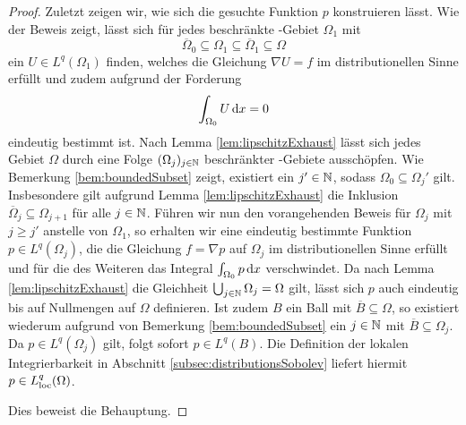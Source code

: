 \begin{proof}
  Zuletzt zeigen wir, wie sich die gesuchte Funktion $p$ konstruieren lässt.
  Wie der Beweis zeigt, lässt sich für jedes beschränkte \lipschitz\hyp{}Gebiet $\Omega_1$ mit $$\overline\Omega_0 \subseteq \Omega_1 \subseteq \overline\Omega_1 \subseteq \Omega$$ ein $U \in L^q(\Omega_1)$ finden, welches die Gleichung $\nabla U = f$ im distributionellen Sinne erfüllt und zudem aufgrund der Forderung 
  $$
  \int_{\Omega_0} U \, {\operatorname{d}\!{x}} = 0
  $$
  eindeutig bestimmt ist.
  Nach Lemma \ref{lem:lipschitzExhaust} lässt sich jedes Gebiet $\Omega$ durch eine Folge $(\Omega_j)_{j \in \mathbb{N}}$ beschränkter \lipschitz\hyp{}Gebiete ausschöpfen.
  Wie Bemerkung \ref{bem:boundedSubset} zeigt, existiert ein $j' \in \mathbb{N}$, sodass $\Omega_0 \subseteq \Omega_j'$ gilt.
  Insbesondere gilt aufgrund Lemma \ref{lem:lipschitzExhaust} die Inklusion $\overline \Omega_j \subseteq \Omega_{j + 1}$ für alle $j \in \mathbb{N}$.
  Führen wir nun den vorangehenden Beweis für $\Omega_j$ mit $j \geq j'$ anstelle von $\Omega_1$, so erhalten wir eine eindeutig bestimmte Funktion $p \in L^q(\Omega_j)$, die die Gleichung $f = \nabla p$ auf $\Omega_j$ im distributionellen Sinne erfüllt und für die des Weiteren das Integral $\int_{\Omega_0} p \, {\operatorname{d}\!{x}}$ verschwindet.
  Da nach Lemma \ref{lem:lipschitzExhaust} die Gleichheit $\bigcup_{j \in \mathbb{N}} \Omega_j = \Omega$ gilt, lässt sich $p$ auch eindeutig bis auf Nullmengen auf $\Omega$ definieren.
  Ist zudem $B$ ein Ball mit $\overline B \subseteq \Omega$, so existiert wiederum aufgrund von Bemerkung \ref{bem:boundedSubset} ein $j \in \mathbb{N}$ mit $\overline B \subseteq \Omega_j$.
  Da $p \in L^q(\Omega_j)$ gilt, folgt sofort $p \in L^q(B)$.
  Die Definition der lokalen Integrierbarkeit in Abschnitt \ref{subsec:distributionsSobolev} liefert hiermit $p \in L^q_{\operatorname{loc}}(\Omega)$.

  Dies beweist die Behauptung.
\end{proof}

